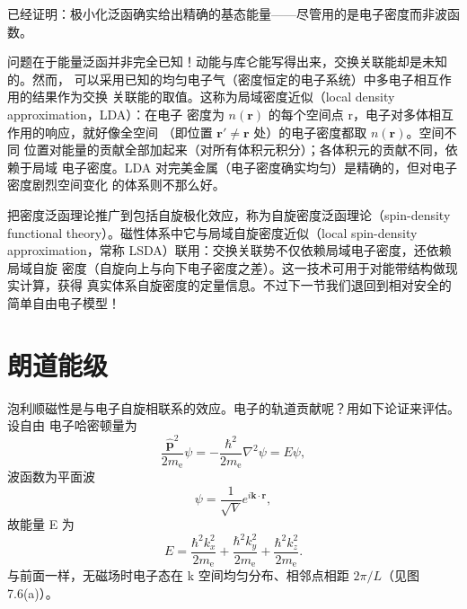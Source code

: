 已经证明：极小化泛函确实给出精确的基态能量——尽管用的是电子密度而非波函数。

问题在于能量泛函并非完全已知！动能与库仑能写得出来，交换关联能却是未知的。然而，
可以采用已知的均匀电子气（密度恒定的电子系统）中多电子相互作用的结果作为交换
关联能的取值。这称为局域密度近似（local density approximation，LDA）：在电子
密度为 $n(\mathbf{r})$ 的每个空间点 r，电子对多体相互作用的响应，就好像全空间
（即位置 $\mathbf{r}'\neq\mathbf{r}$ 处）的电子密度都取 $n(\mathbf{r})$。空间不同
位置对能量的贡献全部加起来（对所有体积元积分）；各体积元的贡献不同，依赖于局域
电子密度。LDA 对完美金属（电子密度确实均匀）是精确的，但对电子密度剧烈空间变化
的体系则不那么好。

把密度泛函理论推广到包括自旋极化效应，称为自旋密度泛函理论（spin-density
functional theory）。磁性体系中它与局域自旋密度近似（local spin-density
approximation，常称 LSDA）联用：交换关联势不仅依赖局域电子密度，还依赖局域自旋
密度（自旋向上与向下电子密度之差）。这一技术可用于对能带结构做现实计算，获得
真实体系自旋密度的定量信息。不过下一节我们退回到相对安全的简单自由电子模型！

\section{朗道能级}

泡利顺磁性是与电子自旋相联系的效应。电子的轨道贡献呢？用如下论证来评估。设自由
电子哈密顿量为
\begin{equation*}
\frac{\hat{\mathbf{p}}^{2}}{2m_{\mathrm{e}}}\psi = -\frac{\hbar^{2}}{2m_{\mathrm{e}}}\nabla^{2}\psi = E\psi,\tag{7.34}
\end{equation*}
波函数为平面波
\begin{equation*}
\psi = \frac{1}{\sqrt{V}}e^{i\mathbf{k}\cdot\mathbf{r}},\tag{7.35}
\end{equation*}
故能量 E 为
\begin{equation*}
E = \frac{\hbar^{2}k_x^{2}}{2m_{\mathrm{e}}} + \frac{\hbar^{2}k_y^{2}}{2m_{\mathrm{e}}} + \frac{\hbar^{2}k_z^{2}}{2m_{\mathrm{e}}}.\tag{7.36}
\end{equation*}
与前面一样，无磁场时电子态在 k 空间均匀分布、相邻点相距 $2\pi/L$（见图 7.6(a)）。

